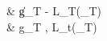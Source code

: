 \documentclass[12pt]{article}
\theoremstyle{definition}
\newcommand\norm[1]{\left\| #1 \right\|}
\newcommand\inner[2]{\left\langle #1, #2 \right\rangle}
\newenvironment{textaligned*}
 {\let\displaystyle\textstyle\csname align*\endcsname}
 {\endalign}
\begin{document}
\pagestyle{empty}

\everymath{\textstyle}

\begin{textaligned*}
\min & \norm{ g_T - \nabla L_T(\theta_T) } \\
 & \inner { g_T } { \nabla L_t(\theta_T) }  \\
\end{textaligned*}
\end{document}

